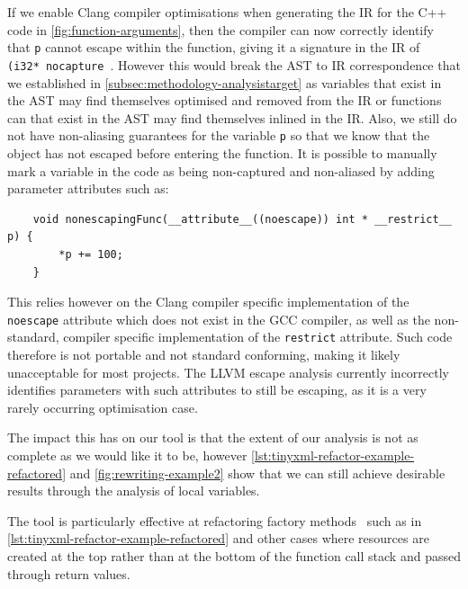 \documentclass{mpaper}
\begin{document}
    If we enable Clang compiler optimisations when generating the IR for the C++ code in  \autoref{fig:function-arguments}, then the compiler can now correctly identify that \texttt{p} cannot escape within the function, giving it a signature in the IR of 
    \texttt{
    (i32* nocapture %
    }.
    However this would break the AST to IR correspondence that we established in \autoref{subsec:methodology-analysistarget} as variables that exist in the AST may find themselves optimised and removed from the IR or functions can that exist in the AST may find themselves inlined in the IR. 
    Also, we still do not have non-aliasing guarantees for the variable \texttt{p} so that we know that the object has not escaped before entering the function.
    It is possible to manually mark a variable in the code as being non-captured and non-aliased by adding parameter attributes such as:
    \begin{verbatim}
    void nonescapingFunc(__attribute__((noescape)) int * __restrict__ p) {
        *p += 100;
    }
    \end{verbatim}
    This relies however on the Clang compiler specific implementation of the \texttt{noescape} attribute which does not exist in the GCC compiler, as well as the non-standard, compiler specific implementation of the \texttt{restrict} attribute. 
    Such code therefore is not portable and not standard conforming, making it likely unacceptable for most projects.
    The LLVM escape analysis currently incorrectly identifies parameters with such attributes to still be escaping, as it is a very rarely occurring optimisation case.

    
    The impact this has on our tool is that the extent of our analysis is not as complete as we would like it to be, however \autoref{lst:tinyxml-refactor-example-refactored} and \autoref{fig:rewriting-example2} show that we can still achieve desirable results through the analysis of local variables. 
    
    The tool is particularly effective at refactoring factory methods~\cite{Gamma1995} such as in \autoref{lst:tinyxml-refactor-example-refactored} and other cases where resources are created at the top rather than at the bottom of the function call stack and passed through return values.
    
\end{document}
